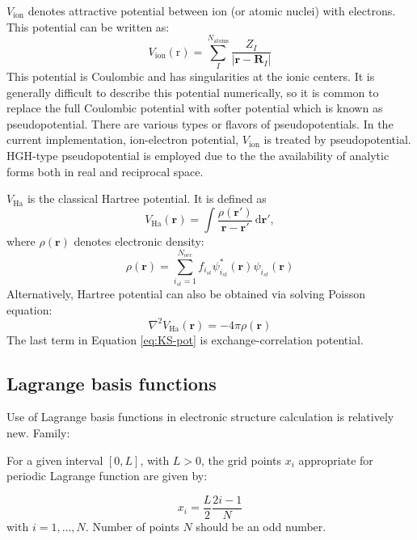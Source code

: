 $V_{\mathrm{ion}}$ denotes attractive potential between ion (or atomic nuclei)
with electrons. This potential can be written as:
\begin{equation}
V_{\mathrm{ion}}(\mathrm{r}) =
\sum_{I}^{N_{\mathrm{atoms}}}
\frac{Z_{I}}{ \left| \mathbf{r} - \mathbf{R}_{I} \right| }
\end{equation}
This potential is Coulombic and has singularities
at the ionic centers. It is generally difficult to describe this potential
numerically, so it is common to replace the full Coulombic potential
with softer potential which is known as pseudopotential.
There are various types or flavors of pseudopotentials.
In the current implementation, ion-electron potential, $V_{\mathrm{ion}}$
is treated by pseudopotential. HGH-type pseudopotential is employed due to the
the availability of analytic forms both in real and reciprocal space.

$V_{\mathrm{Ha}}$ is the classical Hartree potential. It is defined as
\begin{equation}
V_{\mathrm{Ha}}(\mathbf{r}) = \int
\frac{\rho(\mathbf{r}')}
{\mathbf{r} - \mathbf{r}'}\,\mathrm{d}\mathbf{r}',
\end{equation}
where $\rho(\mathbf{r})$ denotes electronic density:
\begin{equation}
\rho(\mathbf{r}) = \sum_{i_{st}=1}^{N_{\mathrm{occ}}}
f_{i_{st}}
\psi^{*}_{i_{st}}(\mathbf{r}) \psi_{i_{st}}(\mathbf{r})
\end{equation}
Alternatively, Hartree potential can also be obtained via solving Poisson equation:
\begin{equation}
\nabla^{2} V_{\mathrm{Ha}}(\mathbf{r}) = -4\pi \rho(\mathbf{r})
\end{equation}
The last term in Equation \eqref{eq:KS-pot} is exchange-correlation potential.

\subsection{Lagrange basis functions}

Use of Lagrange basis functions in electronic structure calculation is relatively new.
Family:

For a given interval $[0,L]$, with $L>0$, the grid points $x_{i}$
appropriate for periodic Lagrange function are given by:

\begin{equation}
x_{i}=\frac{L}{2}\frac{2i-1}{N}
\end{equation}
with $i=1,\ldots,N$. Number of points $N$ should be an odd number.

